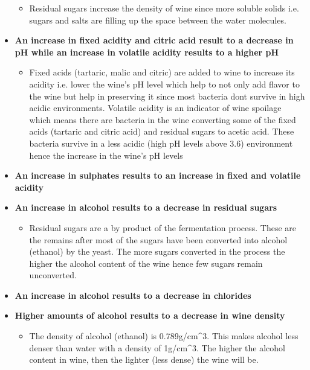 \documentclass[11pt]{article}
\providecommand{\tightlist}{%
      \setlength{\itemsep}{0pt}\setlength{\parskip}{0pt}}
\begin{document}
\begin{itemize}
  \begin{itemize}
  \tightlist
  \item
    Residual sugars increase the density of wine since more soluble
    solids i.e. sugars and salts are filling up the space between the
    water molecules.
  \end{itemize}
\item
  \textbf{An increase in fixed acidity and citric acid result to a
  decrease in pH while an increase in volatile acidity results to a
  higher pH}

  \begin{itemize}
  \tightlist
  \item
    Fixed acids (tartaric, malic and citric) are added to wine to
    increase its acidity i.e. lower the wine's pH level which help to
    not only add flavor to the wine but help in preserving it since most
    bacteria dont survive in high acidic environments. Volatile acidity
    is an indicator of wine spoilage which means there are bacteria in
    the wine converting some of the fixed acids (tartaric and citric
    acid) and residual sugars to acetic acid. These bacteria survive in
    a less acidic (high pH levels above 3.6) environment hence the
    increase in the wine's pH levels
  \end{itemize}
\item
  \textbf{An increase in sulphates results to an increase in fixed and
  volatile acidity}
\item
  \textbf{An increase in alcohol results to a decrease in residual
  sugars}

  \begin{itemize}
  \tightlist
  \item
    Residual sugars are a by product of the fermentation process. These
    are the remains after most of the sugars have been converted into
    alcohol (ethanol) by the yeast. The more sugars converted in the
    process the higher the alcohol content of the wine hence few sugars
    remain unconverted.
  \end{itemize}
\item
  \textbf{An increase in alcohol results to a decrease in chlorides}
\item
  \textbf{Higher amounts of alcohol results to a decrease in wine
  density}

  \begin{itemize}
  \tightlist
  \item
    The density of alcohol (ethanol) is 0.789g/cm\^{}3. This makes
    alcohol less denser than water with a density of 1g/cm\^{}3. The
    higher the alcohol content in wine, then the lighter (less dense)
    the wine will be.
  \end{itemize}
\end{itemize}
\end{document}
